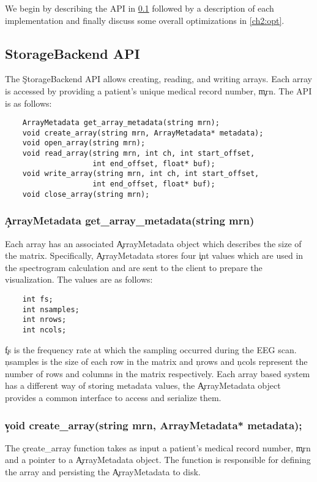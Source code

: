 We begin by describing the API in \ref{ch2:api} followed by a description of
each implementation and finally discuss some overall optimizations in
\ref{ch2:opt}.

\subsection{StorageBackend API}\label{ch2:api}

The \c{StorageBackend} API allows creating, reading, and writing arrays. Each
array is accessed by providing a patient's unique medical record number,
\c{mrn}. The API is as follows:

\begin{lstlisting}
    ArrayMetadata get_array_metadata(string mrn);
    void create_array(string mrn, ArrayMetadata* metadata);
    void open_array(string mrn);
    void read_array(string mrn, int ch, int start_offset,
                    int end_offset, float* buf);
    void write_array(string mrn, int ch, int start_offset,
                    int end_offset, float* buf);
    void close_array(string mrn);
\end{lstlisting}

\subsubsection{\c{ArrayMetadata get\_array\_metadata(string mrn)}}
Each array has an associated \c{ArrayMetadata} object which describes the size
of the matrix. Specifically, \c{ArrayMetadata} stores four \c{int} values which
are used in the spectrogram calculation and are sent to the client to prepare
the visualization. The values are as follows:

\begin{lstlisting}
    int fs;
    int nsamples;
    int nrows;
    int ncols;
\end{lstlisting}

\c{fs} is the frequency rate at which the sampling occurred during the EEG
scan. \c{nsamples} is the size of each row in the matrix and \c{nrows} and
\c{ncols} represent the number of rows and columns in the matrix respectively.
Each array based system has a different way of storing metadata values, the
\c{ArrayMetadata} object provides a common interface to access and serialize them.

\subsubsection{\c{void create\_array(string mrn, ArrayMetadata* metadata);}}
The \c{create\_array} function takes as input a patient's medical record
number, \c{mrn} and a pointer to a \c{ArrayMetadata} object. The function is
responsible for defining the array and persisting the \c{ArrayMetadata} to
disk.

